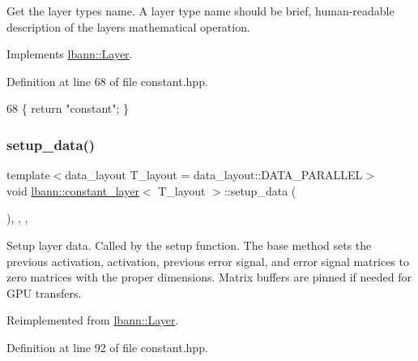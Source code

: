 Get the layer type\textquotesingle{}s name. A layer type name should be brief, human-\/readable description of the layer\textquotesingle{}s mathematical operation. 

Implements \hyperlink{classlbann_1_1Layer_a0fa0ea9160b490c151c0a17fde4f7239}{lbann\+::\+Layer}.



Definition at line 68 of file constant.\+hpp.


\begin{DoxyCode}
68 \{ \textcolor{keywordflow}{return} \textcolor{stringliteral}{"constant"}; \}
\end{DoxyCode}
\mbox{\label{classlbann_1_1constant__layer_ad46d9db2e6bad4204dcedd2be60bfb1a}} 
\subsubsection{\texorpdfstring{setup\+\_\+data()}{setup\_data()}}
{\footnotesize\ttfamily template$<$data\+\_\+layout T\+\_\+layout = data\+\_\+layout\+::\+D\+A\+T\+A\+\_\+\+P\+A\+R\+A\+L\+L\+EL$>$ \\
void \hyperlink{classlbann_1_1constant__layer}{lbann\+::constant\+\_\+layer}$<$ T\+\_\+layout $>$\+::setup\+\_\+data (\begin{DoxyParamCaption}{ }\end{DoxyParamCaption})\hspace{0.3cm}{\ttfamily [inline]}, {\ttfamily [override]}, {\ttfamily [protected]}, {\ttfamily [virtual]}}

Setup layer data. Called by the setup function. The base method sets the previous activation, activation, previous error signal, and error signal matrices to zero matrices with the proper dimensions. Matrix buffers are pinned if needed for G\+PU transfers. 

Reimplemented from \hyperlink{classlbann_1_1Layer_a50a89f8a68762c677d48efe384676e81}{lbann\+::\+Layer}.



Definition at line 92 of file constant.\+hpp.


